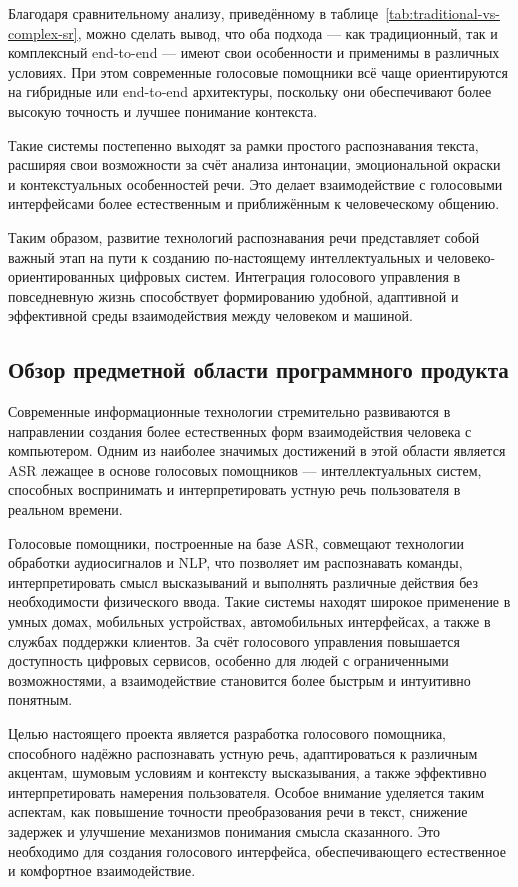 Благодаря сравнительному анализу, приведённому в таблице~\ref{tab:traditional-vs-complex-sr}, можно сделать вывод, что оба подхода — как традиционный, так и комплексный end-to-end — имеют свои особенности и применимы в различных условиях. При этом современные голосовые помощники всё чаще ориентируются на гибридные или end-to-end архитектуры, поскольку они обеспечивают более высокую точность и лучшее понимание контекста.

Такие системы постепенно выходят за рамки простого распознавания текста, расширяя свои возможности за счёт анализа интонации, эмоциональной окраски и контекстуальных особенностей речи. Это делает взаимодействие с голосовыми интерфейсами более естественным и приближённым к человеческому общению.

Таким образом, развитие технологий распознавания речи представляет собой важный этап на пути к созданию по-настоящему интеллектуальных и человеко-ориентированных цифровых систем. Интеграция голосового управления в повседневную жизнь способствует формированию удобной, адаптивной и эффективной среды взаимодействия между человеком и машиной.

\subsection{Обзор предметной области программного продукта}

Современные информационные технологии стремительно развиваются в направлении создания более естественных форм взаимодействия человека с компьютером. Одним из наиболее значимых достижений в этой области является ASR лежащее в основе голосовых помощников — интеллектуальных систем, способных воспринимать и интерпретировать устную речь пользователя в реальном времени.

Голосовые помощники, построенные на базе ASR, совмещают технологии обработки аудиосигналов и NLP, что позволяет им распознавать команды, интерпретировать смысл высказываний и выполнять различные действия без необходимости физического ввода. Такие системы находят широкое применение в умных домах, мобильных устройствах, автомобильных интерфейсах, а также в службах поддержки клиентов. За счёт голосового управления повышается доступность цифровых сервисов, особенно для людей с ограниченными возможностями, а взаимодействие становится более быстрым и интуитивно понятным.

Целью настоящего проекта является разработка голосового помощника, способного надёжно распознавать устную речь, адаптироваться к различным акцентам, шумовым условиям и контексту высказывания, а также эффективно интерпретировать намерения пользователя. Особое внимание уделяется таким аспектам, как повышение точности преобразования речи в текст, снижение задержек и улучшение механизмов понимания смысла сказанного. Это необходимо для создания голосового интерфейса, обеспечивающего естественное и комфортное взаимодействие.

